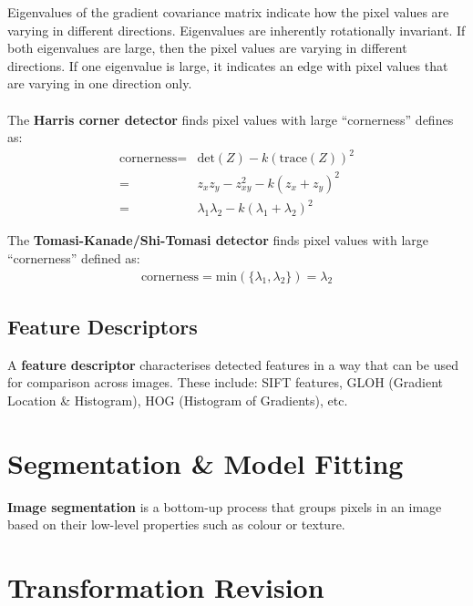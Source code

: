 \documentclass[a4paper,11pt]{article}
\begin{document}
Eigenvalues of the gradient covariance matrix indicate how the pixel values are varying in different directions.
Eigenvalues are inherently rotationally invariant.
If both eigenvalues are large, then the pixel values are varying in different directions.
If one eigenvalue is large, it indicates an edge with pixel values that are varying in one direction only.
\\\\
The \textbf{Harris corner detector} finds pixel values with large ``cornerness'' defines as:
\begin{align*}
    \text{cornerness} =& \text{det}(Z) - k (\text{trace}(Z))^2 \\
    =& z_x z_y - z_{xy}^2 - k (z_x + z_y)^2 \\
    =& \lambda_1 \lambda_2 - k(\lambda_1 + \lambda_2)^2
\end{align*}

The \textbf{Tomasi-Kanade/Shi-Tomasi detector} finds pixel values with large ``cornerness'' defined as:
\begin{align*}
    \text{cornerness} = \text{min}( \{ \lambda_1, \lambda_2 \}) = \lambda_2
\end{align*}

\subsection{Feature Descriptors}
A \textbf{feature descriptor} characterises detected features in a way that can be used for comparison across images.
These include: SIFT features, GLOH (Gradient Location \& Histogram), HOG (Histogram of Gradients), etc.

\section{Segmentation \& Model Fitting}
\textbf{Image segmentation} is a bottom-up process that groups pixels in an image based on their low-level properties such as colour or texture.

\section{Transformation Revision}
\end{document}
